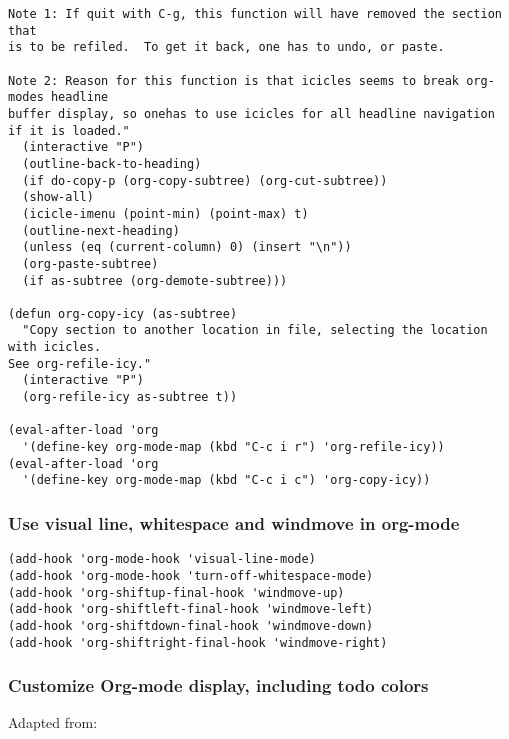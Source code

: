 \documentclass[nofonts]{tufte-handout}
\begin{document}
\begin{enumerate}
\begin{verbatim}
Note 1: If quit with C-g, this function will have removed the section that
is to be refiled.  To get it back, one has to undo, or paste.

Note 2: Reason for this function is that icicles seems to break org-modes headline
buffer display, so onehas to use icicles for all headline navigation if it is loaded."
  (interactive "P")
  (outline-back-to-heading)
  (if do-copy-p (org-copy-subtree) (org-cut-subtree))
  (show-all)
  (icicle-imenu (point-min) (point-max) t)
  (outline-next-heading)
  (unless (eq (current-column) 0) (insert "\n"))
  (org-paste-subtree)
  (if as-subtree (org-demote-subtree)))

(defun org-copy-icy (as-subtree)
  "Copy section to another location in file, selecting the location with icicles.
See org-refile-icy."
  (interactive "P")
  (org-refile-icy as-subtree t))

(eval-after-load 'org
  '(define-key org-mode-map (kbd "C-c i r") 'org-refile-icy))
(eval-after-load 'org
  '(define-key org-mode-map (kbd "C-c i c") 'org-copy-icy))
\end{verbatim}
\end{enumerate}

\subsubsection{Use visual line, whitespace and windmove in org-mode}
\label{sec-2-5-4}

\begin{verbatim}
(add-hook 'org-mode-hook 'visual-line-mode)
(add-hook 'org-mode-hook 'turn-off-whitespace-mode)
(add-hook 'org-shiftup-final-hook 'windmove-up)
(add-hook 'org-shiftleft-final-hook 'windmove-left)
(add-hook 'org-shiftdown-final-hook 'windmove-down)
(add-hook 'org-shiftright-final-hook 'windmove-right)
\end{verbatim}

\subsubsection{Customize Org-mode display, including todo colors}
\label{sec-2-5-5}

Adapted from:
\end{document}
